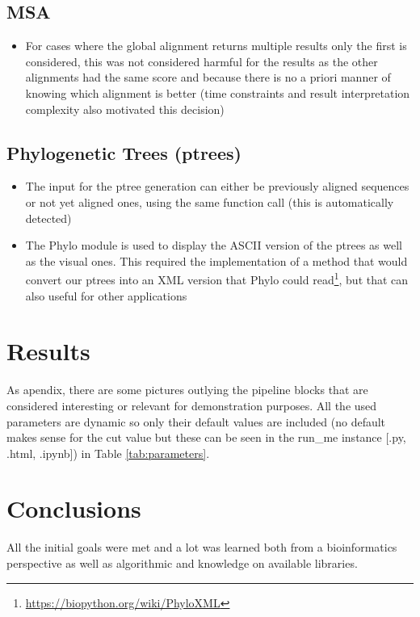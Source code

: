 \documentclass[11pt]{article}
\begin{document}
\subsection{MSA}
\begin{itemize}
    \itemsep0em
    \item For cases where the global alignment returns multiple results only the first is considered, this was not considered harmful for the results as the other alignments had the same score and because there is no a priori manner of knowing which alignment is better (time constraints and result interpretation complexity also motivated this decision)
\end{itemize}

\subsection{Phylogenetic Trees (ptrees)}
\begin{itemize}
    \itemsep0em
    \item The input for the ptree generation can either be previously aligned sequences or not yet aligned ones, using the same function call (this is automatically detected)
    \item The Phylo module is used to display the ASCII version of the ptrees as well as the visual ones. This required the implementation of a method that would convert our ptrees into an XML version that Phylo could read\footnote{\url{https://biopython.org/wiki/PhyloXML}}, but that can also useful for other applications
\end{itemize}



\section{Results}
As apendix, there are some pictures outlying the pipeline blocks that are considered interesting or relevant for demonstration purposes. All the used parameters are dynamic so only their default values are included (no default makes sense for the cut value but these can be seen in the run\_me instance [.py, .html, .ipynb]) in Table \ref{tab:parameters}. 



\section{Conclusions}
All the initial goals were met and a lot was learned both from a bioinformatics perspective as well as algorithmic and knowledge on available libraries. 
\end{document}

